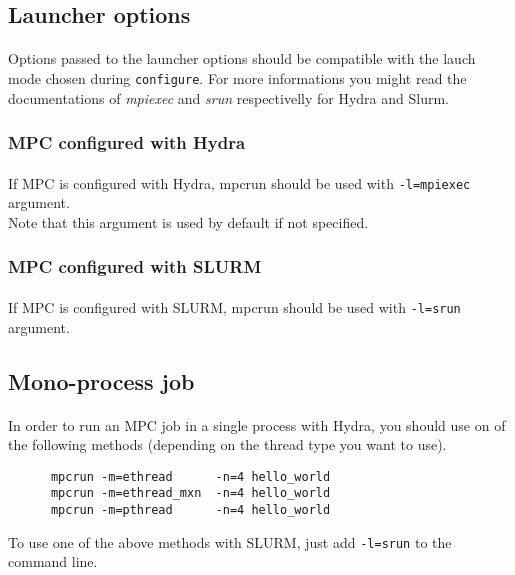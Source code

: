 \documentclass[a4paper,11pt]{article}
\begin{document}
\subsection{Launcher options}

\paragraph{}
Options passed to the launcher options should be compatible with the lauch mode chosen during \texttt{configure}.
For more informations you might read the documentations of \emph{mpiexec}
and \emph{srun} respectivelly for Hydra and Slurm.

\subsubsection*{MPC configured with Hydra}

\paragraph{}
If MPC is configured with Hydra, mpcrun should be used with \texttt{-l=mpiexec} argument. \\
Note that this argument is used by default if not specified.

\subsubsection*{MPC configured with SLURM}
\paragraph{}
If MPC is configured with SLURM, mpcrun should be used with \texttt{-l=srun} argument.

\subsection{Mono-process job}

\paragraph{}
In order to run an MPC job in a single process with Hydra, you should use on of the following methods (depending on the thread type you want to use).

\begin{lstlisting}
      mpcrun -m=ethread      -n=4 hello_world
      mpcrun -m=ethread_mxn  -n=4 hello_world
      mpcrun -m=pthread      -n=4 hello_world
\end{lstlisting}
To use one of the above methods with SLURM, just add \texttt{-l=srun} to the command line.
\\
\end{document}
